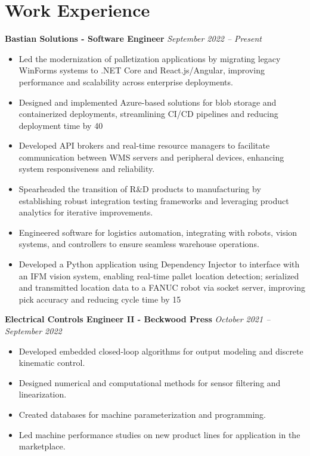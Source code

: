 \documentclass[letterpaper,10pt]{article} %
\newcommand{\job}[3]{
\textbf{#1 - #2} \hfill \textit{#3}
}
\begin{document}
\section{Work Experience}
\noindent\job{Bastian Solutions}{Software Engineer}{September 2022 -- Present}
\begin{itemize}[left=2em]
    \item Led the modernization of palletization applications by migrating legacy WinForms systems to .NET Core and React.js/Angular, improving performance and scalability across enterprise deployments.
    \item Designed and implemented Azure-based solutions for blob storage and containerized deployments, streamlining CI/CD pipelines and reducing deployment time by 40%
    \item Developed API brokers and real-time resource managers to facilitate communication between WMS servers and peripheral devices, enhancing system responsiveness and reliability.
    \item Spearheaded the transition of R&D products to manufacturing by establishing robust integration testing frameworks and leveraging product analytics for iterative improvements.
    \item Engineered software for logistics automation, integrating with robots, vision systems, and controllers to ensure seamless warehouse operations.
    \item Developed a Python application using Dependency Injector to interface with an IFM vision system, enabling real-time pallet location detection; serialized and transmitted location data to a FANUC robot via socket server, improving pick accuracy and reducing cycle time by 15%
\end{itemize}

\noindent\job{Electrical Controls Engineer II}{Beckwood Press}{October 2021 – September 2022}
\begin{itemize}[left=2em]
    \item Developed embedded closed-loop algorithms for output modeling and discrete kinematic control.
    \item Designed numerical and computational methods for sensor filtering and linearization.
    \item Created databases for machine parameterization and programming.
    \item Led machine performance studies on new product lines for application in the marketplace.
\end{itemize}
\end{document}
